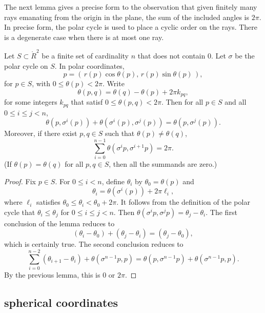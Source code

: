 The next lemma gives a precise form to the observation
that given finitely many rays emanating from the origin
in the plane, the sum of the included angles is $2\pi$.
In precise form, the polar cycle is used to place
a cyclic order on the rays.  There is a degenerate case
when there is at most one ray.


\begin{lemma}\label{lemma:polar-sum}
Let $S\subset\ring{R}^2$ be a finite set
of cardinality $n$ that does not contain $0$.
Let $\sigma$ be the polar cycle on $S$.  
In polar coordinates,
$$p=\left(\, r(p)\cos\theta(p),\, r(p)\sin\theta(p)\,\right),$$ 
for $p\in S$, with
$0\le\theta(p)<2\pi$.
Write
   $$
   \theta(p,q) = \theta(q) - \theta(p) + 2\pi k_{pq},
   $$
for some integers $k_{pq}$ that satisf $0\le \theta(p,q) < 2\pi$.
Then for all $p\in S$
and all $0\le i \le j < n$,
   $$
   \theta(p,\sigma^i(p)) +\theta(\sigma^i(p),\sigma^j(p)) =
   \theta(p,\sigma^j(p)).
   $$
Moreover, if there exist $p,q\in S$ such that $\theta(p)\ne\theta(q)$,
  $$
  \sum_{i=0}^{n-1} \theta(\sigma^{i}p,\sigma^{i+1} p) = 2\pi.
  $$
(If $\theta(p)=\theta(q)$ for all $p,q\in S$, then all the
summands are zero.)
\end{lemma}
%

\begin{proof}
Fix $p\in S$.
For $0\le i<n$, define $\theta_i$ by
   $\theta_0=\theta(p)$ and 
   $$\theta_i = \theta(\sigma^i(p)) + 2\pi \ell_i,$$
where  $\ell_i$ satisfies $\theta_0\le \theta_i < \theta_0+2\pi$.
It follows from the definition of the polar cycle that
$\theta_i \le \theta_j$ for $0\le i\le j < n$.  Then
$\theta(\sigma^i p ,\sigma^j p) = \theta_j - \theta_i$.
The first conclusion of the lemma reduces to
  $$
  (\theta_i-\theta_0) + (\theta_j-\theta_i) = (\theta_j-\theta_0),
  $$
which is certainly true.
The second conclusion reduces to
  $$
  \sum_{i=0}^{n-2} (\theta_{i+1}-\theta_i) + \theta(\sigma^{n-1}p,p)
  = \theta(p,\sigma^{n-1}p) + \theta(\sigma^{n-1}p,p).
  $$
By the previous lemma, this is $0$ or $2\pi$.
\end{proof}

\subsection{spherical coordinates}
\label{sec:spherical}



